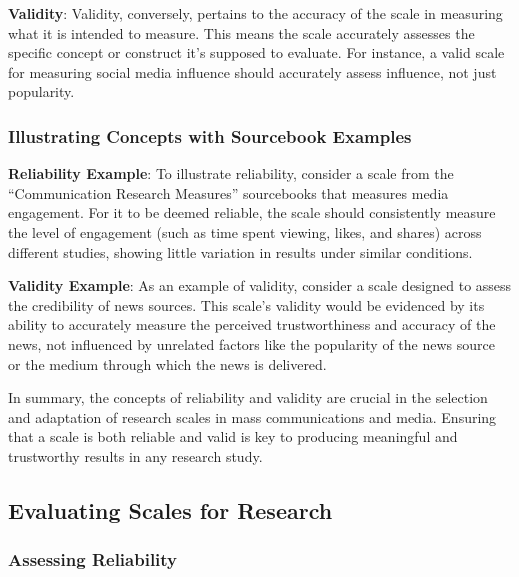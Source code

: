 \documentclass[
]{book}
\begin{document}
\textbf{Validity}: Validity, conversely, pertains to the accuracy of the scale in measuring what it is intended to measure. This means the scale accurately assesses the specific concept or construct it's supposed to evaluate. For instance, a valid scale for measuring social media influence should accurately assess influence, not just popularity.

\subsubsection*{Illustrating Concepts with Sourcebook Examples}\label{illustrating-concepts-with-sourcebook-examples}

\textbf{Reliability Example}: To illustrate reliability, consider a scale from the ``Communication Research Measures'' sourcebooks that measures media engagement. For it to be deemed reliable, the scale should consistently measure the level of engagement (such as time spent viewing, likes, and shares) across different studies, showing little variation in results under similar conditions.

\textbf{Validity Example}: As an example of validity, consider a scale designed to assess the credibility of news sources. This scale's validity would be evidenced by its ability to accurately measure the perceived trustworthiness and accuracy of the news, not influenced by unrelated factors like the popularity of the news source or the medium through which the news is delivered.

In summary, the concepts of reliability and validity are crucial in the selection and adaptation of research scales in mass communications and media. Ensuring that a scale is both reliable and valid is key to producing meaningful and trustworthy results in any research study.

\subsection*{Evaluating Scales for Research}\label{evaluating-scales-for-research}

\subsubsection*{Assessing Reliability}\label{assessing-reliability}
\end{document}

